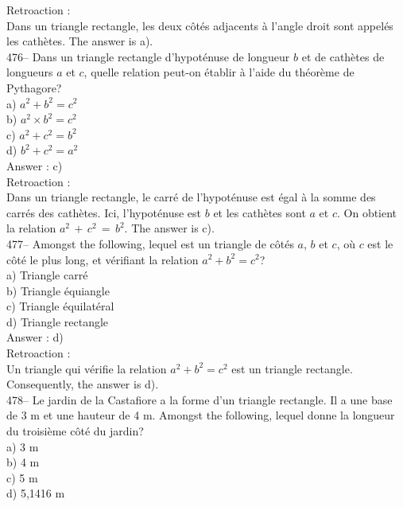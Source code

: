 ﻿\documentclass[letterpaper, 12pt]{article}
\begin{document}
Retroaction : \\
Dans un triangle rectangle, les deux c\^ot\'es adjacents \`a l'angle droit
sont appel\'es les cath\`etes.  The answer is a).\\

476-- Dans un triangle rectangle d'hypot\'enuse de longueur $b$ et de
cath\`etes de longueurs $a$ et $c$, quelle relation peut-on \'etablir \`a
l'aide du th\'eor\`eme de Pythagore?\\
a) $a^{2}+b^{2}=c^{2}$\\
b) $a^{2}\times b^{2}=c^{2}$\\
c) $a^{2}+c^{2}=b^{2}$\\
d) $b^{2}+c^{2}=a^{2}$\\

Answer :  c)\\

Retroaction : \\
Dans un triangle rectangle, le carr\'e de l'hypot\'enuse est \'egal \`a la
somme des carr\'es des cath\`etes.  Ici, l'hypot\'enuse est $b$ et les
cath\`etes sont $a$ et $c$.  On obtient la relation
$a^{2}\,+\,c^{2}\,=\,b^{2}$.  The answer is c).\\


477-- Amongst the following, lequel est un triangle de c\^ot\'es
$a$, $b$ et $c$, o\`u $c$ est le c\^ot\'e le plus long, et v\'erifiant la
relation  $a^{2}+b^{2}=c^{2}$?\\
a) Triangle carr\'e\\
b) Triangle \'equiangle\\
c) Triangle \'equilat\'eral\\
d) Triangle rectangle\\

Answer :  d)\\

Retroaction : \\
Un triangle qui v\'erifie la relation $a^{2}+b^{2}=c^{2}$ est un triangle
rectangle. Consequently, the answer is d).\\


478-- Le jardin de la Castafiore a la forme d'un triangle rectangle.  Il a
une base de
3 m et une hauteur de 4 m.  Amongst the following, lequel donne la
longueur du troisi\`eme c\^ot\'e du jardin?\\
a) 3 m\\
b) 4 m\\
c) 5 m\\
d) 5,1416 m\\
\end{document}
